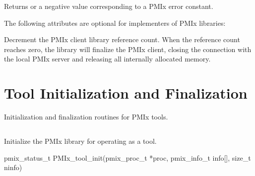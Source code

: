 \begin{arglist}
\end{arglist}

Returns  or a negative value corresponding to a PMIx error constant.

\optattrstart
The following attributes are optional for implementers of \ac{PMIx} libraries:

\optattrend

\descr

Decrement the \ac{PMIx} client library reference count.
When the reference count reaches zero, the library will finalize the \ac{PMIx} client, closing the connection with the local \ac{PMIx} server and releasing all internally allocated memory.


\section{Tool Initialization and Finalization}
\label{chap:api_init:tool}

Initialization and finalization routines for \ac{PMIx} tools.

\subsection{}

\summary

Initialize the \ac{PMIx} library for operating as a tool.

\format

\cspecificstart
\begin{codepar}
pmix_status_t
PMIx_tool_init(pmix_proc_t *proc,
               pmix_info_t info[], size_t ninfo)
\end{codepar}
\cspecificend

\begin{arglist}
\end{arglist}

